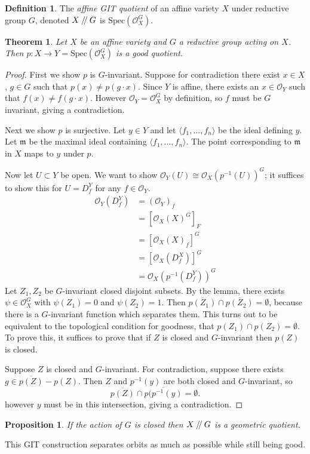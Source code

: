 \documentclass{article}
\newtheorem{thm}{Theorem}
\newtheorem{prop}{Proposition}
\theoremstyle{definition}
\newtheorem{defn}{Definition}
\newcommand{\OO}{\mathcal{O}}
\newcommand{\sslash}{\mathbin{/\mkern-4mu/}}
\newcommand{\Spec}{\text{Spec}}
\newcommand{\m}{\mathfrak{m}}
\begin{document}
\begin{defn}
	The \emph{affine GIT quotient} of an affine variety $X$ under reductive group $G$, denoted $X\sslash G$ is $\Spec(\OO_X^G)$.
\end{defn}
\begin{thm}
	Let $X$ be an affine variety and $G$ a reductive group acting on $X$. Then $p:X\to Y=\Spec(\OO_X^G)$ is a good quotient.
\end{thm}
\begin{proof}
	First we show $p$ is $G$-invariant. Suppose for contradiction there exist $x\in X$, $g\in G$ such that $p(x) \neq p(g\cdot x)$. Since $Y$ is affine, there exists an $x\in \OO_Y$ such that $f(x)\neq f(g\cdot x)$. However $\OO_Y = \OO_X^G$ by definition, so $f$ must be $G$ invariant, giving a contradiction. \vspace{1em}
	
	Next we show $p$ is surjective. Let $y\in Y$ and let $\langle f_1,...,f_n\rangle$ be the ideal defining $y$. Let $\m$ be the maximal ideal containing $\langle f_1,...,f_n\rangle$. The point corresponding to $\m$ in $X$ maps to $y$ under $p$. \vspace{1em}
	
	Now let $U\subset Y$ be open. We want to show $\OO_Y(U)\cong \OO_X(p^{-1}(U))^G$; it suffices to show this for $U=D_f^Y$ for any $f\in \OO_Y$.
	\begin{align*}
		\OO_Y(D_f^Y) &= (\OO_Y)_f\\
		&= [\OO_X(X)^G]_F\\
		& =[\OO_X(X)_f]^G\\
		&=[\OO_X(D_f^X)]^G\\
		&=\OO_X(p^{-1}(D_f^Y))^G
	\end{align*} 
	Let $Z_1,Z_2$ be $G$-invariant closed disjoint subsets. By the lemma, there exists $\psi \in \OO_X^G$ with $\psi(Z_1)=0$ and $\psi(Z_2)=1$. Then $\overline{p(Z_1)}\cap\overline{p(Z_2)}=\emptyset$, because there is a $G$-invariant function which separates them. This turns out to be equivalent to the topological condition for goodness, that $p(Z_1)\cap p(Z_2)=\emptyset$. To prove this, it suffices to prove that if $Z$ is closed and $G$-invariant then $p(Z)$ is closed. \vspace{1em}
	
	Suppose $Z$ is closed and $G$-invariant. For contradiction, suppose there exists $g\in \overline{p(Z)}-p(Z)$. Then $Z$ and $p^{-1}(y)$ are both closed and $G$-invariant, so 
	\begin{equation}
		\overline{p(Z)}\cap\overline{p(p^{-1}(y)} = \emptyset.
	\end{equation}
however $y$ must be in this intersection, giving a contradiction.
\end{proof}
\begin{prop}
	If the action of $G$ is closed then $X\sslash G$ is a geometric quotient.
\end{prop}
This GIT construction separates orbits as much as possible while still being good.
\end{document}
